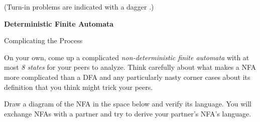 \documentclass[11pt]{book}
\newcommand{\doctitle}{Deterministic Finite Automata}
\begin{document}
\begin{center}
  (Turn-in problems are indicated with a dagger \turninproblem{}.)
\end{center}

\begin{center}
  \large\textbf{{\doctitle}}
\end{center}

\vspace{2em}


\begin{problem}{Complicating the Process}

On your own, come up a complicated \emph{non-deterministic finite automata} with
at most \emph{8 states} for your peers to analyze.  Think carefully about what
makes a NFA more complicated than a DFA and any particularly nasty corner cases
about its definition that you think might trick your peers.

Draw a diagram of the NFA in the space below and verify its language.  You will
exchange NFAs with a partner and try to derive your partner's NFA's language.

\end{problem}

\newpage

\end{document}
